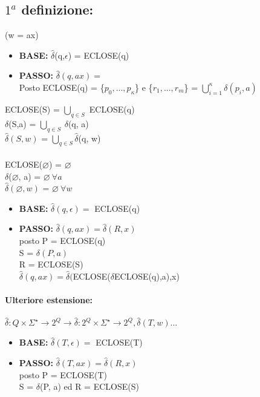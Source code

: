 \documentclass[12pt, a4paper, openany, oneside]{book}
\begin{document}
\subsection{$1^{a}$ definizione:}
(w = ax)
\begin{itemize}
	\item \textbf{BASE: } $\widehat{\delta}$(q,$\epsilon$) = ECLOSE(q)
	\item \textbf{PASSO: } $\widehat{\delta}(q, ax) = $\\
	Posto ECLOSE(q) = \{$p_{0}, ..., p_{\kappa}$\} e \{$r_{1}, ..., r_{m}$\} = 
	$\bigcup \limits_{i = 1}^{\kappa} \delta (p_{i}, a)$
\end{itemize}

ECLOSE(S) = $\bigcup \limits_{q \in S}$ ECLOSE(q)\\ 
$\delta$(S,a) = $\bigcup \limits_{q \in S} ~ \delta$(q, a)\\
$\widehat{\delta}(S, w)$ = $\bigcup \limits_{q \in S} \widehat{\delta}$(q, w)\\

\paragraph{}ECLOSE($\varnothing$) = $\varnothing$\\
$\delta$($\varnothing$, a) = $\varnothing ~ \forall a$\\
$\widehat{\delta}(\varnothing, w)$ = $\varnothing ~ \forall w$

\begin{itemize}
	\item \textbf{BASE: }$\widehat{\delta}(q,\epsilon) =$ ECLOSE(q)
	\item \textbf{PASSO: }$\widehat{\delta}(q, ax) = \widehat{\delta}(R, x)$\\
	posto P = ECLOSE(q)\\
	S = $\delta(P,a)$\\
	R = ECLOSE(S)\\
	$\widehat{\delta}(q, ax) = \widehat{\delta}($ECLOSE($\delta$ECLOSE(q),a),x) 
\end{itemize}
\paragraph{Ulteriore estensione: }
$\widehat{\delta} : Q \times \Sigma^{\star} \to 2^{Q} \to \widehat{\delta} 
: 2^{Q} \times \Sigma^{\star} \to 2^{Q}, \widehat{\delta}(T, w)...$

\begin{itemize}
	\item \textbf{BASE: }$\widehat{\delta}(T, \epsilon) = $ ECLOSE(T)
	\item \textbf{PASSO: }$\widehat{\delta}(T, ax) = \widehat{\delta}(R, x)$\\
	posto P = ECLOSE(T)\\
	S = $\delta$(P, a) ed R = ECLOSE(S)
\end{itemize}
\end{document}
